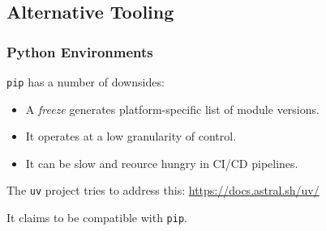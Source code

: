 {%
%  

%  

\subsection{Alternative Tooling}
\begin{frame}[fragile]
  \frametitle{Python Environments }
  \vspace{3mm}
  \texttt{pip} has a number of downsides:
  \begin{itemize}
    \item A \textsl{freeze} generates platform-specific list of module versions.
    \item It operates at a low granularity of control.
    \item It can be slow and reource hungry in CI/CD pipelines.
  \end{itemize}
  
  \pause
  \vspace{5mm}
  The \texttt{uv} project tries to address this: \url{https://docs.astral.sh/uv/}
  
  \vspace{5mm}
  It claims to be compatible with \texttt{pip}.
\end{frame}

%  

%  

}

